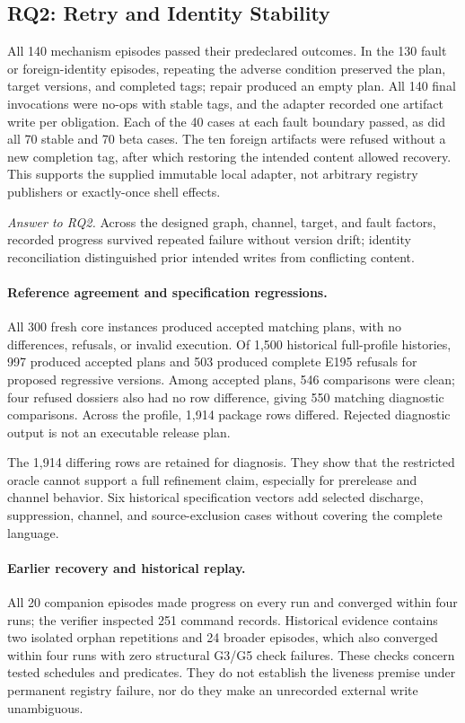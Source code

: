 \subsection{RQ2: Retry and Identity Stability}
All 140 mechanism episodes passed their predeclared outcomes. In the 130 fault
or foreign-identity episodes, repeating the adverse condition preserved the
plan, target versions, and completed tags; repair produced an empty plan. All
140 final invocations were no-ops with stable tags, and the adapter recorded
one artifact write per obligation. Each of the 40 cases at each fault boundary
passed, as did all 70 stable and 70 beta cases. The ten foreign artifacts were
refused without a new completion tag, after which restoring the intended
content allowed recovery. This supports the supplied immutable local adapter,
not arbitrary registry publishers or exactly-once shell effects.

\emph{Answer to RQ2.} Across the designed graph, channel, target, and fault
factors, recorded progress survived repeated failure without version drift;
identity reconciliation distinguished prior intended writes from conflicting
content.

\paragraph{Reference agreement and specification regressions.}
\label{sec:eval:fresh}
All 300 fresh core instances produced accepted matching plans, with no
differences, refusals, or invalid execution. Of 1,500 historical full-profile
histories, 997 produced accepted plans and 503 produced complete E195
refusals for proposed regressive versions. Among accepted plans, 546
comparisons were clean; four refused dossiers also had no row difference,
giving 550 matching diagnostic comparisons. Across the profile, 1,914 package
rows differed. Rejected diagnostic output is not an executable release plan.

The 1,914 differing rows are retained for diagnosis. They show that the
restricted oracle cannot support a full refinement claim, especially for
prerelease and channel behavior. Six historical specification vectors add
selected discharge, suppression, channel, and source-exclusion cases without
covering the complete language.

\paragraph{Earlier recovery and historical replay.}
All 20 companion episodes made progress on every run and converged within
four runs; the verifier inspected 251 command records. Historical evidence
contains two isolated orphan repetitions and 24 broader episodes, which also
converged within four runs with zero structural G3/G5 check failures. These
checks concern tested schedules and predicates. They do
not establish the liveness premise under permanent registry failure, nor do
they make an unrecorded external write unambiguous.

